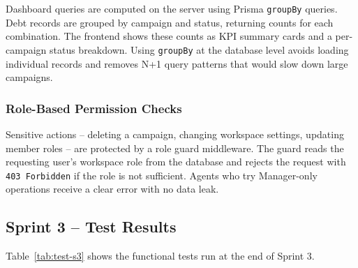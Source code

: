 \documentclass[12pt,a4paper]{report}
\begin{document}
Dashboard queries are computed on the server using Prisma \texttt{groupBy} queries.
Debt records are grouped by campaign and status, returning counts for each
combination.
The frontend shows these counts as KPI summary cards and a per-campaign status
breakdown.
Using \texttt{groupBy} at the database level avoids loading individual records and
removes N+1 query patterns that would slow down large campaigns.

\subsubsection{Role-Based Permission Checks}

Sensitive actions -- deleting a campaign, changing workspace settings, updating
member roles -- are protected by a role guard middleware.
The guard reads the requesting user's workspace role from the database and rejects
the request with \texttt{403 Forbidden} if the role is not sufficient.
Agents who try Manager-only operations receive a clear error with no data leak.

\subsection{Sprint 3 -- Test Results}

Table~\ref{tab:test-s3} shows the functional tests run at the end of Sprint 3.
\end{document}
